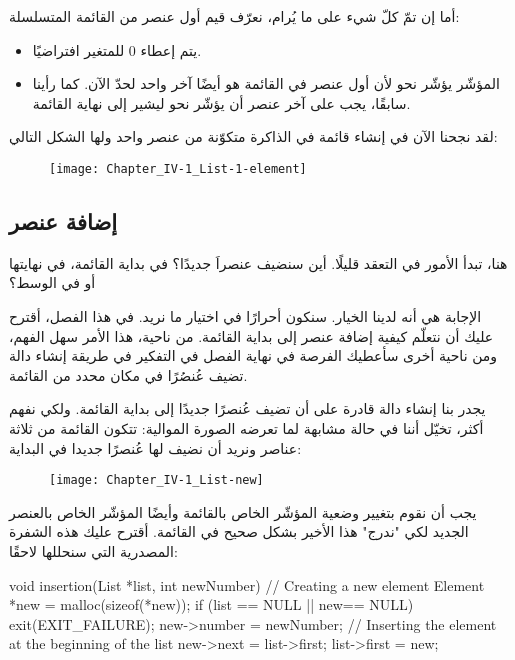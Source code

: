 أما إن تمّ كلّ شيء على ما يُرام، نعرّف قيم أول عنصر من القائمة المتسلسلة:

\begin{itemize}
	\item يتم إعطاء $ 0 $ للمتغير
	افتراضيًا.
	\item المؤشّر
	يؤشّر نحو
	لأن أول عنصر في القائمة هو أيضًا آخر واحد لحدّ الآن. كما رأينا سابقًا، يجب على آخر عنصر أن يؤشّر نحو
	ليشير إلى نهاية القائمة.
\end{itemize}

لقد نجحنا الآن في إنشاء قائمة في الذاكرة متكوّنة من عنصر واحد ولها الشكل التالي:

\begin{figure}[H]
	\centering
	\texttt{[image: Chapter\_IV-1\_List-1-element]}
\end{figure}

\subsection{إضافة عنصر}

هنا، تبدأ الأمور في التعقد قليلًا. أين سنضيف عنصراَ جديدًا؟ في بداية القائمة، في نهايتها أو في الوسط؟

الإجابة هي أنه لدينا الخيار. سنكون أحرارًا في اختيار ما نريد. في هذا الفصل، أقترح عليك أن نتعلّم كيفية إضافة عنصر إلى بداية القائمة. من ناحية، هذا الأمر سهل الفهم، ومن ناحية أخرى سأعطيك الفرصة في نهاية الفصل في التفكير في طريقة إنشاء دالة تضيف عُنصُرًا في مكان محدد من القائمة.

يجدر بنا إنشاء دالة قادرة على أن تضيف عُنصرًا جديدًا إلى بداية القائمة. ولكي نفهم أكثر، تخيّل أننا في حالة مشابهة لما تعرضه الصورة الموالية: تتكون القائمة من ثلاثة عناصر ونريد أن نضيف لها عُنصرًا جديدا في البداية:

\begin{figure}[H]
	\centering
	\texttt{[image: Chapter\_IV-1\_List-new]}
\end{figure}

يجب أن نقوم بتغيير وضعية المؤشّر
الخاص بالقائمة وأيضًا المؤشّر
الخاص بالعنصر الجديد لكي "ندرج" هذا الأخير بشكل صحيح في القائمة. أقترح عليك هذه الشفرة المصدرية التي سنحللها لاحقًا:

\begin{Csource}
void insertion(List *list, int newNumber)
{
	// Creating a new element
	Element *new = malloc(sizeof(*new));
	if (list == NULL || new== NULL)
	{
		exit(EXIT_FAILURE);
	}
	new->number = newNumber;	
	// Inserting the element at the beginning of the list
	new->next = list->first;
	list->first = new;
}
\end{Csource}

